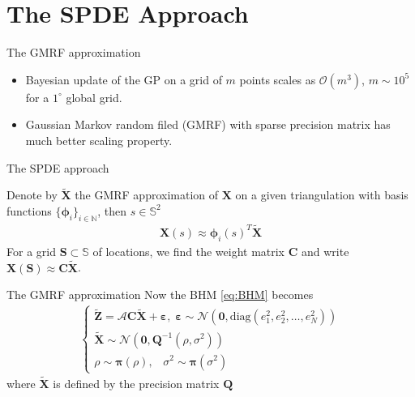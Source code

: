 \documentclass{beamer}
\begin{document}
\section{The SPDE Approach}
\begin{frame}{The GMRF approximation}
\begin{itemize}
\item Bayesian update of the GP on a grid of $m$ points scales as $\mathcal{O}(m^3)$, $m \sim 10^5$ for a $1^\circ $ global grid.
\item Gaussian Markov random filed (GMRF) with sparse precision matrix  has much better scaling property.
\end{itemize}

\begin{block}{The SPDE approach \citep{Lindgren2011}} 

Denote by $\bm{\tilde{X}}$ the GMRF approximation of $\bm{X}$ on a given triangulation with basis functions $\{ \bm{\phi}_i \}_{i \in \mathbb{N}}$, then  $s \in \mathbb{S}^2$
\begin{align}
\bm{X}(s) \approx \bm{\phi}_i(s)^T\bm{\tilde{X}}
\end{align}
For a grid $\bm{S} \subset \mathbb{S}$ of locations, we find the weight matrix $\bm{C}$ and write $\bm{X}(\bm{S}) \approx \bm{C}\bm{\tilde{X}}$.
\end{block}
\end{frame}

\begin{frame}{The GMRF approximation}
Now the BHM \ref{eq:BHM} becomes
\begin{align}\label{eq:BHM_gmrf}
\left\{ \begin{array}{l}
\bm{\tilde{Z}} = \bm{\mathcal{A}}\bm{C}\bm{\tilde{X}} + \bm{\varepsilon}, \; 
\bm{\varepsilon} \sim \mathcal{N} (\bm{0}, \mbox{diag}(e_1^2, e_2^2, \dots, e_N^2)) \\
\bm{\tilde{X}} \sim \mathcal{N}(\bm{0}, \bm{Q}^{-1}(\rho, \sigma^2)) \\
\rho \sim \bm{\pi}(\rho), \;\;\; \sigma^2 \sim \bm{\pi}(\sigma^2)
\end{array} \right.
\end{align}
where $\bm{\tilde{X}} $ is defined by the precision matrix $\bm{Q}$

\end{frame}
\end{document}
